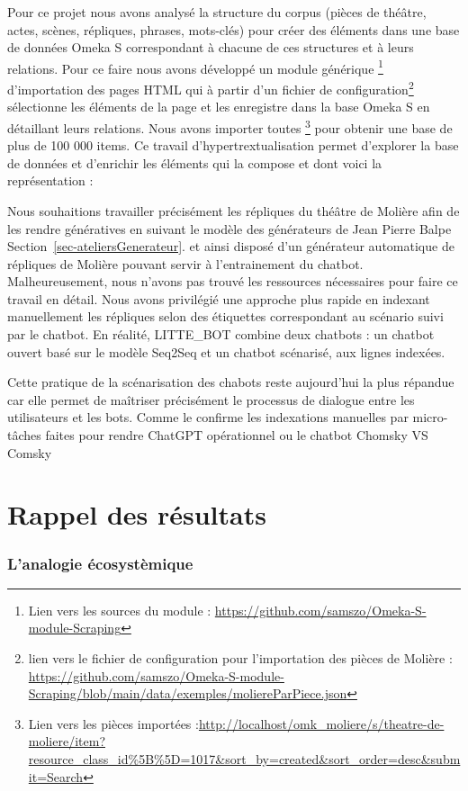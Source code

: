 \documentclass[
  a4paper,
  DIV=11,
  numbers=noendperiod]{scrreprt}
\begin{document}
Pour ce projet nous avons analysé la structure du corpus (pièces de
théâtre, actes, scènes, répliques, phrases, mots-clés) pour créer des
éléments dans une base de données Omeka S correspondant à chacune de ces
structures et à leurs relations. Pour ce faire nous avons développé un
module générique \footnote{Lien vers les sources du module :
  \url{https://github.com/samszo/Omeka-S-module-Scraping}} d'importation
des pages HTML qui à partir d'un fichier de configuration\footnote{lien
  vers le fichier de configuration pour l'importation des pièces de
  Molière :
  \url{https://github.com/samszo/Omeka-S-module-Scraping/blob/main/data/exemples/moliereParPiece.json}}
sélectionne les éléments de la page et les enregistre dans la base Omeka
S en détaillant leurs relations. Nous avons importer toutes \footnote{Lien
  vers les pièces importées
  :\url{http://localhost/omk_moliere/s/theatre-de-moliere/item?resource_class_id\%5B\%5D=1017&sort_by=created&sort_order=desc&submit=Search}}
pour obtenir une base de plus de 100 000 items. Ce travail
d'hypertrextualisation permet d'explorer la base de données et
d'enrichir les éléments qui la compose et dont voici la représentation :

Nous souhaitions travailler précisément les répliques du théâtre de
Molière afin de les rendre génératives en suivant le modèle des
générateurs de Jean Pierre Balpe Section~\ref{sec-ateliersGenerateur}.
et ainsi disposé d'un générateur automatique de répliques de Molière
pouvant servir à l'entrainement du chatbot. Malheureusement, nous
n'avons pas trouvé les ressources nécessaires pour faire ce travail en
détail. Nous avons privilégié une approche plus rapide en indexant
manuellement les répliques selon des étiquettes correspondant au
scénario suivi par le chatbot. En réalité, LITTE\_BOT combine deux
chatbots : un chatbot ouvert basé sur le modèle Seq2Seq et un chatbot
scénarisé, aux lignes indexées.

Cette pratique de la scénarisation des chabots reste aujourd'hui la plus
répandue car elle permet de maîtriser précisément le processus de
dialogue entre les utilisateurs et les bots. Comme le confirme les
indexations manuelles par micro-tâches faites pour rendre ChatGPT
opérationnel ou le chatbot Chomsky VS Comsky

\chapter{Rappel des résultats}\label{sec-resultats}

\subsection{L'analogie écosystèmique}\label{sec-analogieEcosysteme}
\end{document}
